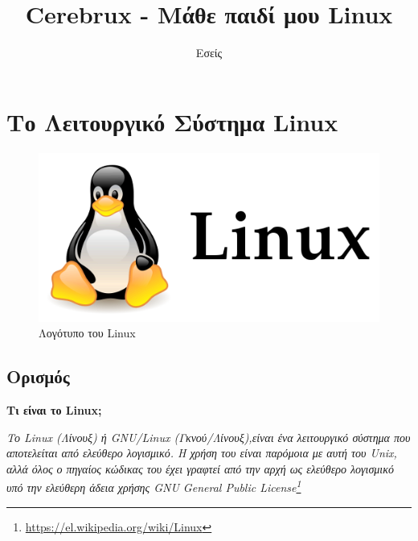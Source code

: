 \documentclass[a4paper,titlepage,oneside,12pt]{article}
\title{Cerebrux - Μάθε παιδί μου Linux}
\author{Εσείς}
\begin{document}
\maketitle  

\section{Το Λειτουργικό Σύστημα Linux} 

\begin{figure} [!hbp]
\centering
\includegraphics[width=1\linewidth]{linux-logo.png} 
\caption{Λογότυπο του Linux}
\end{figure}

\subsection{Ορισμός}
\textbf{Τι είναι το Linux;} 
\medskip

\textit{Το Linux (Λίνουξ) ή GNU/Linux (Γκνού/Λίνουξ),είναι ένα λειτουργικό σύστημα που αποτελείται από ελεύθερο λογισμικό. Η χρήση του είναι παρόμοια με αυτή του Unix, αλλά όλος ο πηγαίος κώδικας του έχει γραφτεί από την αρχή ως ελεύθερο λογισμικό υπό την ελεύθερη άδεια χρήσης GNU General Public License\footnote{\url{https://el.wikipedia.org/wiki/Linux}}}
\end{document}
